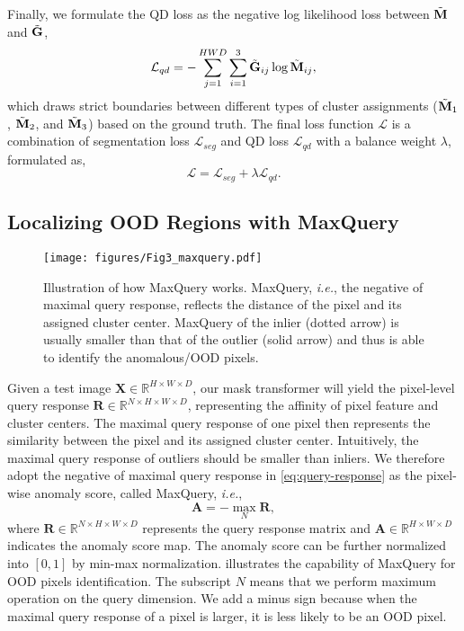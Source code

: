 \documentclass[10pt,twocolumn,letterpaper]{article}
\begin{document}
Finally, we formulate the QD loss as the negative log likelihood loss between $\Tilde{\mathbf{M}}$ and $\Tilde{\mathbf{G}}$,
\begin{equation}
    \mathcal{L}_{qd} = -\sum_{j=1}^{HWD} \sum_{i=1}^{3} \Tilde{\mathbf{G}}_{ij}\log \Tilde{\mathbf{M}}_{ij},
\end{equation}
which draws strict boundaries between different types of cluster assignments ($\Tilde{\mathbf{M}}_1$, $\Tilde{\mathbf{M}}_2$, and $\Tilde{\mathbf{M}}_3$) based on the ground truth.
The final loss function $\mathcal{L}$ is a combination of segmentation loss $\mathcal{L}_{seg}$ and QD loss $\mathcal{L}_{qd}$ with a balance weight $\lambda$, formulated as,
\begin{equation}
    \mathcal{L} = \mathcal{L}_{seg} + \lambda \mathcal{L}_{qd}.
\end{equation}

\subsection{Localizing OOD Regions with MaxQuery}
\label{sec:method_ood}

\begin{figure}[t]
  \centering
   \texttt{[image: figures/Fig3\_maxquery.pdf]}
   \vspace{-2mm}
   \caption{Illustration of how MaxQuery works. MaxQuery, \textit{i.e.}, the negative of maximal query response, reflects the distance of the pixel and its assigned cluster center. MaxQuery of the inlier (dotted arrow) is usually smaller than that of the outlier (solid arrow) and thus is able to identify the anomalous/OOD pixels.}
   \label{fig:maxquery}
   \vspace{-3mm}
\end{figure} 

Given a test image $\mathbf{X} \in \mathbb{R}^{H \times W \times D}$, our mask transformer will yield the pixel-level query response $\mathbf{R} \in \mathbb{R}^{N \times H \times W \times D}$, representing the affinity of pixel feature and cluster centers. The maximal query response of one pixel then represents the similarity between the pixel and its assigned cluster center. Intuitively, the maximal query response of outliers should be smaller than inliers. We therefore adopt the negative of maximal query response in \cref{eq:query-response} as the pixel-wise anomaly score, called MaxQuery, \textit{i.e.},
\begin{equation}
    \label{eq:anom-score}
    \mathbf{A} = -\max_{N} \mathbf{R},
\end{equation}
where $\mathbf{R} \in \mathbb{R}^{N \times H \times W \times D}$ represents the query response matrix and $\mathbf{A} \in \mathbb{R}^{H \times W \times D}$ indicates the anomaly score map. The anomaly score can be further normalized into $[0, 1]$ by min-max normalization.   illustrates the capability of MaxQuery for OOD pixels identification. The subscript $N$ means that we perform maximum operation on the query dimension. We add a minus sign because when the maximal query response of a pixel is larger, it is less likely to be an OOD pixel.
\end{document}
